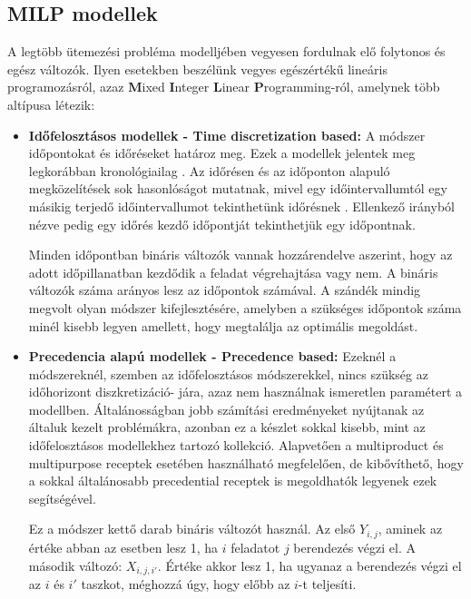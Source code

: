 \subsection{MILP modellek}
A legtöbb ütemezési probléma modelljében vegyesen fordulnak elő folytonos és egész változók. Ilyen esetekben beszélünk vegyes egészértékű lineáris programozásról, azaz \textbf{M}ixed \textbf{I}nteger \textbf{L}inear \textbf{P}rogramming-ról, amelynek több altípusa létezik:
\begin{itemize}
  \item[] \textbf{Időfelosztásos modellek - Time discretization based:} A módszer időpontokat és időréseket határoz meg. Ezek a modellek jelentek meg legkorábban kronológiailag \cite{kondili}. Az időrésen és az időponton alapuló megközelítések sok hasonlóságot mutatnak, mivel egy időintervallumtól egy másikig terjedő időintervallumot tekinthetünk időrésnek \cite{susarla}. Ellenkező irányból nézve pedig egy időrés kezdő időpontját tekinthetjük egy időpontnak.  
  
  Minden időpontban bináris változók vannak hozzárendelve aszerint, hogy az adott időpillanatban kezdődik a feladat végrehajtása vagy nem. A bináris változók száma arányos lesz az időpontok számával. A szándék mindig megvolt olyan módszer kifejlesztésére, amelyben a szükséges időpontok száma minél kisebb legyen amellett, hogy megtalálja az optimális megoldást. 
  
  \item[] \textbf{Precedencia alapú modellek - Precedence based:} Ezeknél a módszereknél, szemben az időfelosztásos módszerekkel, nincs szükség az időhorizont diszkretizáció- jára, azaz nem használnak ismeretlen paramétert a modellben. Általánosságban jobb számítási eredményeket nyújtanak az általuk kezelt problémákra, azonban ez a készlet sokkal kisebb, mint az időfelosztásos modellekhez tartozó kollekció. Alapvetően a multiproduct és multipurpose receptek esetében használható megfelelően, de kibővíthető, hogy a sokkal általánosabb precedential receptek is megoldhatók legyenek ezek segítségével. 
  
Ez a módszer kettő darab bináris változót használ. Az első $Y_{i,j}$, aminek az értéke abban az esetben lesz 1, ha $i$ feladatot $j$ berendezés végzi el. A második változó: $X_{i,j,i'}$. Értéke akkor lesz 1, ha ugyanaz a berendezés végzi el az $i$ és $i'$ taszkot, méghozzá úgy, hogy előbb az $i$-t teljesíti. 
\end{itemize}
